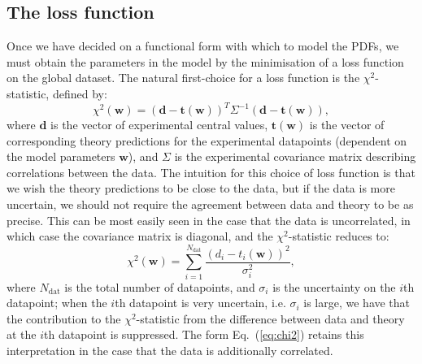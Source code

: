 \documentclass[withindex,glossary]{cam-thesis}
\renewcommand{\vec}[1]{\textbf{#1}} %
\begin{document}
\subsection{The loss function}
\label{sec:the_loss_function}
Once we have decided on a functional form with which to model the PDFs, we must obtain the parameters in the model by the minimisation of a loss function on the global dataset. The natural first-choice for a loss function is the $\chi^2$-statistic, defined by:
\begin{equation}
\label{eq:chi2}
\chi^2(\vec{w}) = (\vec{d} - \vec{t}(\vec{w}))^T \Sigma^{-1} (\vec{d} - \vec{t}(\vec{w})),
\end{equation}
where $\vec{d}$ is the vector of experimental central values, $\vec{t}(\vec{w})$ is the vector of corresponding theory predictions for the experimental datapoints (dependent on the model parameters $\vec{w}$), and $\Sigma$ is the experimental covariance matrix describing correlations between the data. The intuition for this choice of loss function is that we wish the theory predictions to be close to the data, but if the data is more uncertain, we should not require the agreement between data and theory to be as precise. This can be most easily seen in the case that the data is uncorrelated, in which case the covariance matrix is diagonal, and the $\chi^2$-statistic reduces to:
\begin{equation}
\label{eq:chi2_uncorrelated}
\chi^2(\vec{w}) = \sum_{i=1}^{N_{\text{dat}}} \frac{(d_i - t_i(\vec{w}))^2}{\sigma_i^2},
\end{equation}
where $N_{\text{dat}}$ is the total number of datapoints, and $\sigma_i$ is the uncertainty on the $i$th datapoint; when the $i$th datapoint is very uncertain, i.e. $\sigma_i$ is large, we have that the contribution to the $\chi^2$-statistic from the difference between data and theory at the $i$th datapoint is suppressed. The form Eq.~(\ref{eq:chi2}) retains this interpretation in the case that the data is additionally correlated.
\end{document}
